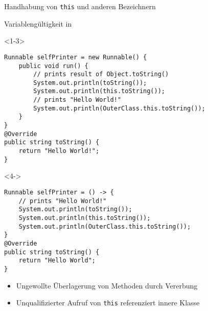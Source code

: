 \begin{frame}[fragile]{Handhabung von \texttt{this} und anderen Bezeichnern}
    \begin{center}
        \begin{minipage}[b]{0.75\textwidth}
            \begin{block}{Variablengültigkeit in }
                \begin{onlyenv}<1-3>
                    \begin{lstlisting}
Runnable selfPrinter = new Runnable() {
    public void run() {
        // prints result of Object.toString()
        System.out.println(toString()); 
        System.out.println(this.toString());
        // prints "Hello World!"
        System.out.println(OuterClass.this.toString()); 
    }
}
@Override
public string toString() {
    return "Hello World!";
}
                    \end{lstlisting}                        
                \end{onlyenv}
                \begin{onlyenv}<4->
                    \begin{lstlisting}
Runnable selfPrinter = () -> {
    // prints "Hello World!"
    System.out.println(toString()); 
    System.out.println(this.toString()); 
    System.out.println(OuterClass.this.toString()); 
}
@Override
public string toString() {
    return "Hello World";
}
                    \end{lstlisting}                        
                \end{onlyenv}
            \end{block}
        \end{minipage}
    \end{center}

    \begin{itemize}
        \item<2-> Ungewollte Überlagerung von Methoden durch Vererbung
        \item<3-> Unqualifizierter Aufruf von \texttt{this} referenziert innere Klasse 
    \end{itemize}
\end{frame}


